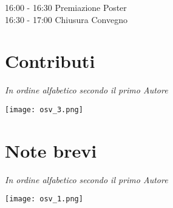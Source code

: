 \documentclass[10pt,twoside,openright,x11names,svgnames,italian,a4paper,dvipsnames,table]{memoir}
\begin{document}
{16:00 - 16:30 Premiazione Poster \\
16:30 - 17:00 Chiusura Convegno \\

\part{Contributi}
\setcounter{figure}{0}
\setcounter{table}{0}
{\hspace*{\fill} \emph{In ordine alfabetico secondo il primo Autore}}
\begin{center}
\vspace*{\fill}
\texttt{[image: osv\_3.png]}
\vspace*{\fill}
\end{center}
\afterpage{\restorepagecolor}
\pagestyle{CIOpage}
















\part{Note brevi}
{\hspace*{\fill} \emph{In ordine alfabetico secondo il primo Autore}}\\
\begin{center}
\vspace*{\fill}
\texttt{[image: osv\_1.png]}
\vspace*{\fill}
\end{center}
\afterpage{\restorepagecolor}


}
\end{document}
